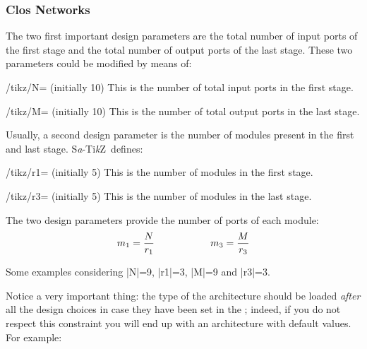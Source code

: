 \documentclass{ltxdoc}
\newcommand\Tikz{Ti\textit kZ}
\newcommand{\saTikZ}{S\textit{a}-\Tikz}
\begin{document}
\subsubsection{Clos Networks}
\label{subsubsec:clos}
The two first important design parameters are the total number of input ports of the first stage and the total number of output ports of the last stage. These two parameters could be modified by means of:

\begin{key}{/tikz/N= (initially 10)}
    This is the number of total input ports in the first stage.
\end{key}

\begin{key}{/tikz/M= (initially 10)}
    This is the number of total output ports in the last stage.
\end{key}

Usually, a second design parameter is the number of modules present in the first and last stage. \saTikZ\ defines:

\begin{key}{/tikz/r1= (initially 5)}
    This is the number of modules in the first stage.
\end{key}

\begin{key}{/tikz/r3= (initially 5)}
    This is the number of modules in the last stage.
\end{key}

The two design parameters provide the number of ports of each module:
\[m_1=\dfrac{N}{r_1} \hspace*{2cm} m_3=\dfrac{M}{r_3} \]

Some examples considering |N|=9, |r1|=3, |M|=9 and |r3|=3.
\begin{codeexample}[]
\begin{tikzpicture}
    \node[N=9,r1=3,M=9,r3=3,clos rear] {};
\end{tikzpicture}
\end{codeexample}

\begin{codeexample}[]
\begin{tikzpicture}
    \node[N=9,r1=3,M=9,r3=3,clos snb] {};
\end{tikzpicture}
\end{codeexample}

Notice a very important thing: the type of the architecture should be loaded \emph{after} all the design choices in case they have been set in the ; indeed, if you do not respect this constraint you will end up with an architecture with default values. For example:
\end{document}
